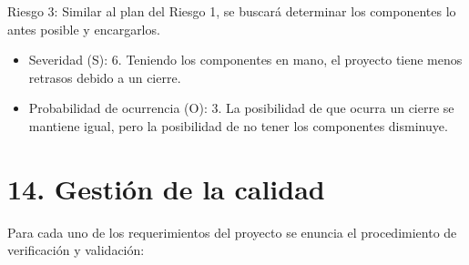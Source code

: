 \documentclass[
11pt, %
]{charter}
\begin{document}
Riesgo 3: Similar al plan del Riesgo 1, se buscará determinar los componentes lo antes posible y encargarlos.
\begin{itemize}
	\item Severidad (S): 6. Teniendo los componentes en mano, el proyecto tiene menos retrasos debido a un cierre.
  \item Probabilidad de ocurrencia (O): 3. La posibilidad de que ocurra un cierre se mantiene igual, pero la posibilidad de no tener los componentes disminuye.
\end{itemize}


\section{14. Gestión de la calidad}
\label{sec:calidad}

Para cada uno de los requerimientos del proyecto se enuncia el procedimiento de verificación y validación:
\end{document}
